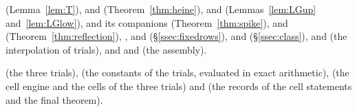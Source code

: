 \begin{description}[leftmargin=1.5em,style=nextline]
 (Lemma~\ref{lem:T}),  and 
(Theorem~\ref{thm:heine}),  and  (Lemmas~\ref{lem:LGup}
and~\ref{lem:LGlow}),  and its companions (Theorem~\ref{thm:spike}), 
and  (Theorem~\ref{thm:reflection}), ,  and
 (\S\ref{ssec:fixedrows}),  and  (\S\ref{ssec:class}),
 and  (the interpolation of trials), and  and 
(the assembly).
\item[Trials and cells]  (the three trials),  (the constants
of the trials, evaluated in exact arithmetic),  (the cell engine and the cells of the
three trials) and  (the records of the cell statements and the final theorem).
\end{description}

